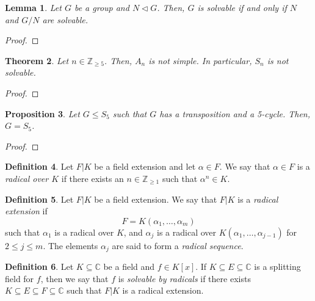 \documentclass[a4paper, openany]{memoir}
\theoremstyle{definition}
\newtheorem{definition}{Definition}[section]
\theoremstyle{plain}
\newtheorem{theorem}[definition]{Theorem}
\newtheorem{lemma}[definition]{Lemma}
\newtheorem{proposition}[definition]{Proposition}
\begin{document}
    \begin{lemma}
        Let $G$ be a group and $N \vartriangleleft G$. Then, $G$ is solvable if and only if $N$ and $G/N$ are solvable.
    \end{lemma}
    \begin{proof}
        
    \end{proof}

    \begin{theorem}
        Let $n \in \mathbb{Z}_{\geq 5}$. Then, $A_n$ is not simple. In particular, $S_n$ is not solvable.
    \end{theorem}
    \begin{proof}
        
    \end{proof}

    \begin{proposition}
        Let $G \leq S_5$ such that $G$ has a transposition and a 5-cycle. Then, $G = S_5$.
    \end{proposition}
    \begin{proof}
        
    \end{proof}

    \begin{definition}
        Let $F|K$ be a field extension and let $\alpha \in F$. We say that $\alpha \in F$ is a \emph{radical over $K$} if there exists an $n \in \mathbb{Z}_{\geq 1}$ such that $\alpha^n \in K$.
    \end{definition}

    \begin{definition}
        Let $F|K$ be a field extension. We say that $F|K$ is a \emph{radical extension} if
        \[F = K(\alpha_1, \dots, \alpha_m)\]
        such that $\alpha_1$ is a radical over $K$, and $\alpha_j$ is a radical over $K(\alpha_1, \dots, \alpha_{j-1})$ for $2 \leq j \leq m$. The elements $\alpha_j$ are said to form a \emph{radical sequence}.
    \end{definition}

    \begin{definition}
        Let $K \subseteq \mathbb{C}$ be a field and $f \in K[x]$. If $K \subseteq E \subseteq \mathbb{C}$ is a splitting field for $f$, then we say that $f$ is \emph{solvable by radicals} if there exists $K \subseteq E \subseteq F \subseteq \mathbb{C}$ such that $F|K$ is a radical extension.
    \end{definition}
\end{document}
